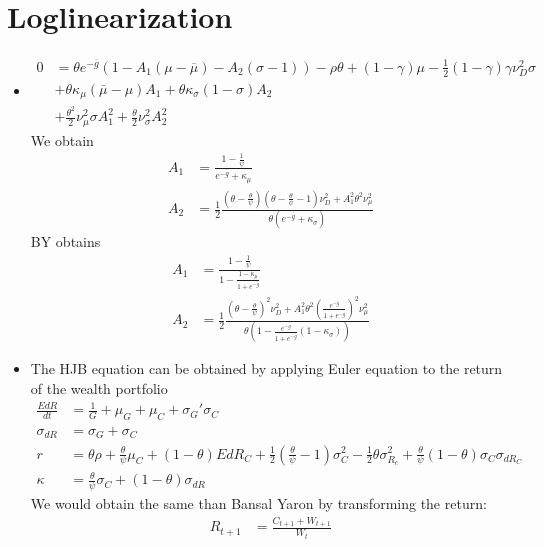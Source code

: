 \documentclass[english]{article}
\begin{document}
\section{Loglinearization}
\begin{itemize}
	\item 
	\begin{align*}
		0&= \theta e^{-\overline{g}}(1 -A_1(\mu-\overline{\mu}) -A_2(\sigma - 1)) - \rho \theta +  (1-\gamma)\mu - \frac{1}{2}(1-\gamma)\gamma\nu_D^2\sigma\\
		&+ \theta \kappa_{\mu}(\bar{\mu}-\mu)A_1+  \theta\kappa_{\sigma}(1-\sigma)A_2\\
		&+\frac{\theta^2}{2}\nu^2_\mu\sigma A_1^2 + \frac{\theta}{2}\nu^2_\sigma A_2^2
	\end{align*}
	We obtain
	\begin{align*}
		A_1&= \frac{1-\frac{1}{\psi}}{e^{-\overline{g}} + \kappa_\mu}\\
		A_2 &=\frac{1}{2} \frac{(\theta-\frac{\theta}{\psi})(\theta-\frac{\theta}{\psi}-1) \nu_D^2+ A_1^2\theta^2\nu_\mu^2 }{\theta(e^{-\overline{g}} + \kappa_\sigma)}
	\end{align*}
	BY obtains
	\begin{align*}
		A_1&= \frac{1-\frac{1}{\psi}}{1 - \frac{1-\kappa_\mu}{1 + e^{-\overline{g}}}}\\
		A_2&= \frac{1}{2}\frac{(\theta-\frac{\theta}{\psi})^2\nu_D^2 + A_1^2 \theta^2(\frac{e^{-\overline{g}}}{1 +  e^{-\overline{g}}})^2 \nu_\mu^2}{\theta(1 - \frac{e^{-\overline{g}}}{1 +  e^{-\overline{g}}}(1-\kappa_\sigma))}
	\end{align*}
	\item The HJB equation can  be obtained by applying Euler equation to the return of the wealth portfolio
	\begin{align*}
		\frac{EdR}{dt}  &= \frac{1}{G} + \mu_G+\mu_C + \sigma_G'\sigma_C\\
		\sigma_{dR} &= \sigma_G + \sigma_C\\
		r&= \theta\rho +\frac{\theta}{\psi} \mu_C + (1-\theta) EdR_C + \frac{1}{2}(\frac{\theta}{\psi}-1)\sigma^2_C -\frac{1}{2}\theta \sigma^2_{R_c} + \frac{\theta}{\psi}(1-\theta)\sigma_C\sigma_{dR_C}\\
		\kappa&= \frac{\theta}{\psi}\sigma_C +(1-\theta)\sigma_{dR}
	\end{align*}
	We would obtain the same than Bansal Yaron by transforming the return:
	\begin{align*}
		R_{t+1} &= \frac{C_{t+1}+ W_{t+1}}{W_t}\\

\end{align*}
\end{itemize}
\end{document}
